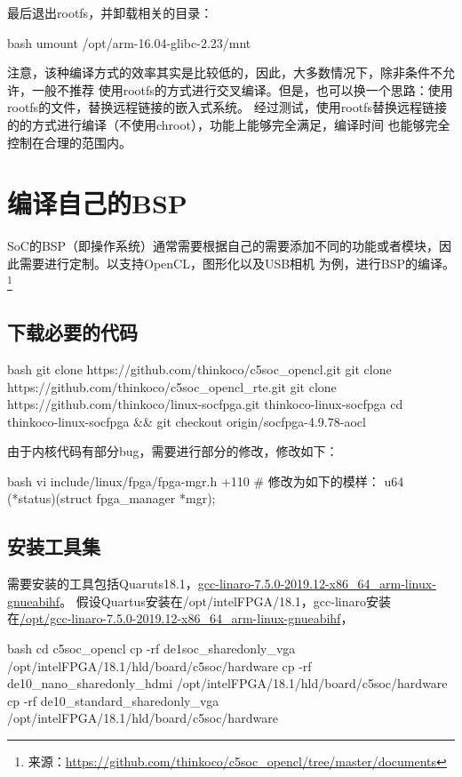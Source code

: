 最后退出rootfs，并卸载相关的目录：
\begin{code-block}{bash}
umount /opt/arm-16.04-glibc-2.23/mnt
\end{code-block}

注意，该种编译方式的效率其实是比较低的，因此，大多数情况下，除非条件不允许，一般不推荐
使用rootfs的方式进行交叉编译。但是，也可以换一个思路：使用rootfs的文件，替换远程链接的嵌入式系统。
经过测试，使用rootfs替换远程链接的的方式进行编译（不使用chroot），功能上能够完全满足，编译时间
也能够完全控制在合理的范围内。

\section{编译自己的BSP}
SoC的BSP（即操作系统）通常需要根据自己的需要添加不同的功能或者模块，因此需要进行定制。以支持OpenCL，图形化以及USB相机
为例，进行BSP的编译。
\footnote{来源：\url{https://github.com/thinkoco/c5soc_opencl/tree/master/documents}}

\subsection{下载必要的代码}
\begin{code-block}{bash}
git clone https://github.com/thinkoco/c5soc_opencl.git
git clone https://github.com/thinkoco/c5soc_opencl_rte.git
git clone https://github.com/thinkoco/linux-socfpga.git thinkoco-linux-socfpga
cd thinkoco-linux-socfpga && git checkout origin/socfpga-4.9.78-aocl
\end{code-block}

由于内核代码有部分bug，需要进行部分的修改，修改如下：
\begin{code-block}{bash}
vi include/linux/fpga/fpga-mgr.h +110
# 修改为如下的模样：
u64 (*status)(struct fpga_manager *mgr);
\end{code-block}

\subsection{安装工具集}
需要安装的工具包括Quaruts18.1，\url{gcc-linaro-7.5.0-2019.12-x86\_64\_arm-linux-gnueabihf}。
假设Quartus安装在/opt/intelFPGA/18.1，gcc-linaro安装在\url{/opt/gcc-linaro-7.5.0-2019.12-x86\_64\_arm-linux-gnueabihf}，
\begin{code-block}{bash}
cd c5soc_opencl
cp -rf de1soc_sharedonly_vga /opt/intelFPGA/18.1/hld/board/c5soc/hardware
cp -rf de10_nano_sharedonly_hdmi /opt/intelFPGA/18.1/hld/board/c5soc/hardware
cp -rf de10_standard_sharedonly_vga /opt/intelFPGA/18.1/hld/board/c5soc/hardware
\end{code-block}

